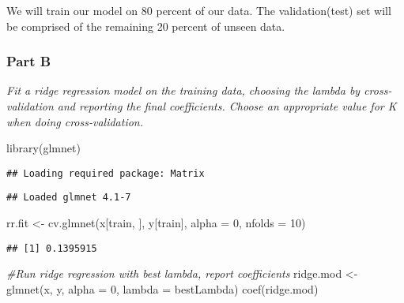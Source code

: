 \documentclass[
]{article}
\newenvironment{Shaded}{\begin{snugshade}}{\end{snugshade}}
\newcommand{\AttributeTok}[1]{\textcolor[rgb]{0.77,0.63,0.00}{#1}}
\newcommand{\CommentTok}[1]{\textcolor[rgb]{0.56,0.35,0.01}{\textit{#1}}}
\newcommand{\DecValTok}[1]{\textcolor[rgb]{0.00,0.00,0.81}{#1}}
\newcommand{\FunctionTok}[1]{\textcolor[rgb]{0.00,0.00,0.00}{#1}}
\newcommand{\NormalTok}[1]{#1}
\newcommand{\OtherTok}[1]{\textcolor[rgb]{0.56,0.35,0.01}{#1}}
\newcommand{\SpecialCharTok}[1]{\textcolor[rgb]{0.00,0.00,0.00}{#1}}
\begin{document}
We will train our model on 80 percent of our data. The validation(test)
set will be comprised of the remaining 20 percent of unseen data.

\hypertarget{part-b-1}{%
\subsubsection{Part B}\label{part-b-1}}

\emph{Fit a ridge regression model on the training data, choosing the
lambda by cross-validation and reporting the final coefficients. Choose
an appropriate value for K when doing cross-validation.}

\begin{Shaded}
\begin{Highlighting}[]
\FunctionTok{library}\NormalTok{(glmnet)}
\end{Highlighting}
\end{Shaded}

\begin{verbatim}
## Loading required package: Matrix
\end{verbatim}

\begin{verbatim}
## Loaded glmnet 4.1-7
\end{verbatim}

\begin{Shaded}
\begin{Highlighting}[]
\NormalTok{rr.fit }\OtherTok{\textless{}{-}} \FunctionTok{cv.glmnet}\NormalTok{(x[train, ], y[train], }\AttributeTok{alpha =} \DecValTok{0}\NormalTok{, }\AttributeTok{nfolds =} \DecValTok{10}\NormalTok{) }
\end{Highlighting}
\end{Shaded}

\begin{Shaded}
\end{Shaded}

\begin{verbatim}
## [1] 0.1395915
\end{verbatim}

\begin{Shaded}
\begin{Highlighting}[]
\CommentTok{\#Run ridge regression with best lambda, report coefficients}
\NormalTok{ridge.mod }\OtherTok{\textless{}{-}} \FunctionTok{glmnet}\NormalTok{(x, y, }\AttributeTok{alpha =} \DecValTok{0}\NormalTok{, }\AttributeTok{lambda =}\NormalTok{ bestLambda)}
\FunctionTok{coef}\NormalTok{(ridge.mod)}
\end{Highlighting}
\end{Shaded}
\end{document}
